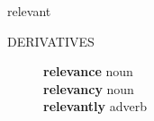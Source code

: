 \documentclass[avery5372, grid]{flashcards}
\begin{document}
\begin{flashcard}{\Huge relevant}
\begin{description}
			
			
			
			
			
			
			
			
		\item[\textsc{DERIVATIVES}] \textbf{rel\textbullet e\textbullet vance} noun\\
			\textbf{rel\textbullet e\textbullet van\textbullet cy} noun\\
			\textbf{rel\textbullet e\textbullet vant\textbullet ly} adverb
	\end{description}
\end{flashcard}







				
\end{document}
